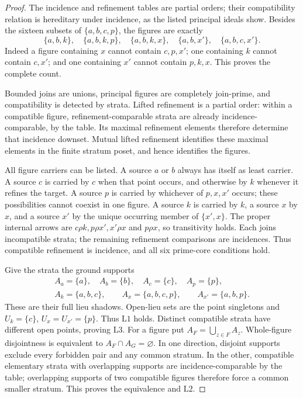 \begin{proof}
The incidence and refinement tables are partial orders; their
compatibility relation is hereditary under incidence, as the
listed principal ideals show. Besides the sixteen subsets of
$\{a,b,c,p\}$, the figures are exactly
\[
 \{a,b,k\},\quad\{a,b,k,p\},\quad\{a,b,k,x\},\quad
 \{a,b,x'\},\quad\{a,b,c,x'\}.
\]
Indeed a figure containing $x$ cannot contain $c,p,x'$; one
containing $k$ cannot contain $c,x'$; and one containing $x'$
cannot contain $p,k,x$. This proves the complete count.

Bounded joins are unions, principal figures are completely
join-prime, and compatibility is detected by strata. Lifted
refinement is a partial order: within a compatible figure,
refinement-comparable strata are already incidence-comparable,
by the table. Its maximal refinement elements therefore determine
that incidence downset. Mutual lifted refinement identifies
these maximal elements in the finite stratum poset, and hence
identifies the figures.

All figure carriers can be listed. A source $a$ or $b$ always
has itself as least carrier. A source $c$ is carried by $c$
when that point occurs, and otherwise by $k$ whenever it refines
the target. A source $p$ is carried by whichever of $p,x,x'$
occurs; these possibilities cannot coexist in one figure.
A source $k$ is carried by $k$, a source $x$ by $x$, and a
source $x'$ by the unique occurring member of $\{x',x\}$.
The proper internal arrows are $c\rho k,p\rho x',x'\rho x$
and $p\rho x$, so transitivity holds. Each joins incompatible
strata; the remaining refinement comparisons are incidences.
Thus compatible refinement is incidence, and all six prime-core
conditions hold.

Give the strata the ground supports
\[
\begin{gathered}
 A_a=\{a\},\quad A_b=\{b\},\quad A_c=\{c\},\quad A_p=\{p\},\\
 A_k=\{a,b,c\},\qquad A_x=\{a,b,c,p\},\qquad A_{x'}=\{a,b,p\}.
\end{gathered}
\]
These are their full lieu shadows. Open-lieu sets are the point
singletons and $U_k=\{c\}$, $U_x=U_{x'}=\{p\}$.
Thus $\mathrm L1$ holds. Distinct compatible strata have different
open points, proving $\mathrm L3$.
For a figure put $A_F=\bigcup_{z\in F}A_z$.
Whole-figure disjointness is equivalent to $A_F\cap A_G=\varnothing$.
In one direction, disjoint supports exclude every forbidden pair
and any common stratum. In the other, compatible elementary
strata with overlapping supports are incidence-comparable by
the table; overlapping supports of two compatible figures
therefore force a common smaller stratum. This proves the
equivalence and $\mathrm L2$.


\end{proof}
